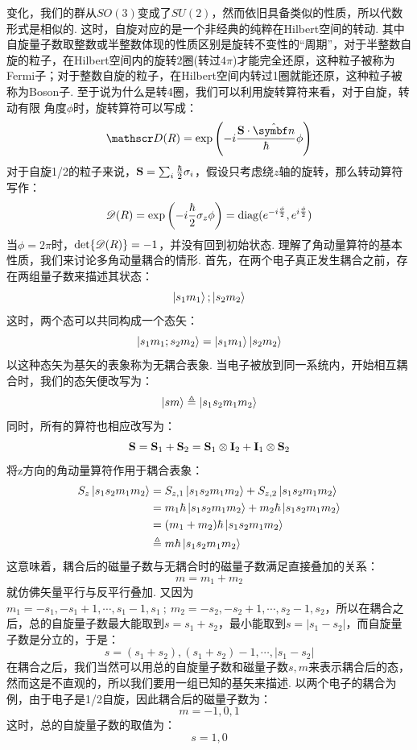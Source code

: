 变化，我们的群从\(SO(3)\)变成了\(SU(2)\)，然而依旧具备类似的性质，所以代数形式是相似的. 这时，自旋对应的是一个非经典的纯粹在Hilbert空间的转动. 其中
自旋量子数取整数或半整数体现的性质区别是旋转不变性的“周期”，对于半整数自旋的粒子，在Hilbert空间内的旋转2圈(转过\(4\pi\))才能完全还原，这种粒子被称为
Fermi子；对于整数自旋的粒子，在Hilbert空间内转过1圈就能还原，这种粒子被称为Boson子. 至于说为什么是转4圈，我们可以利用旋转算符来看，对于自旋，转动有限
角度\(\phi\)时，旋转算符可以写成：
\[
\rotate(R) = \exp\br{-i\frac{\vS\cdot\uv{n}}{\hh}\phi}
\]
对于自旋1/2的粒子来说，\(\mathbf{S} = \sum_{i}\frac{\hbar}{2}\sigma_{i}\)，假设只考虑绕\(z\)轴的旋转，那么转动算符写作：
\[
\mathscr{D}(R) = \exp\left({-i\frac{\hbar}{2}\sigma_{z}\phi}\right) = \mathrm{diag}(e^{-i\frac{\phi}{2}},e^{i\frac{\phi}{2}})
\]
当\(\phi = 2\pi\)时，\(\det{\mathscr{D}(R)} = -1\)，并没有回到初始状态. 理解了角动量算符的基本性质，我们来讨论多角动量耦合的情形. 首先，在两个电子真正发生耦合之前，存在两组量子数来描述其状态：
\[
\ket{s_{1}m_{1}} ; \ket{s_{2}m_{2}}
\]
这时，两个态可以共同构成一个态矢：
\[
\ket{s_{1}m_{1};s_{2}m_{2}} = \ket{s_{1}m_{1}}\ket{s_{2}m_{2}}
\]
以这种态矢为基矢的表象称为无耦合表象. 当电子被放到同一系统内，开始相互耦合时，我们的态矢便改写为：
\[
\ket{sm}\triangleq\ket{s_{1}s_{2}m_{1}m_{2}}
\]
同时，所有的算符也相应改写为：
\[
\mathbf{S} = \mathbf{S}_{1} + \mathbf{S}_{2} = \mathbf{S}_{1}\otimes \mathbf{I}_{2} + \mathbf{I}_{1}\otimes\mathbf{S}_{2}
\]
将z方向的角动量算符作用于耦合表象：
\begin{align*}
{S}_{z}\ket{s_{1}s_{2}m_{1}m_{2}} 
& = {S}_{z,1}\ket{s_{1}s_{2}m_{1}m_{2}} + {S}_{z,2}\ket{s_{1}s_{2}m_{1}m_{2}} \\
& = m_{1}\hbar\ket{s_{1}s_{2}m_{1}m_{2}} + m_{2}\hbar\ket{s_{1}s_{2}m_{1}m_{2}} \\
& = (m_{1} + m_{2})\hbar\ket{s_{1}s_{2}m_{1}m_{2}}  \\
&\triangleq m\hbar\ket{s_{1}s_{2}m_{1}m_{2}} 
\end{align*}
这意味着，耦合后的磁量子数与无耦合时的磁量子数满足直接叠加的关系：
\[
m = m_{1} + m_{2}
\]
就仿佛矢量平行与反平行叠加. 又因为\(m_{1}=-s_{1},-s_{1}+1,\cdots,s_{1}-1,s_{1}\ ;\ m_{2} = -s_{2},-s_{2}+1,\cdots,s_{2}-1,s_{2}\)，所以在耦合之后，总的自旋量子数最大能取到\(s=s_{1}+s_{2}\)，最小能取到\(s=|s_{1} - s_{2}|\)，而自旋量子数是分立的，于是：
\[
s = (s_{1}+s_{2}), (s_{1}+s_{2})-1, \cdots, |s_{1} - s_{2}|
\]
在耦合之后，我们当然可以用总的自旋量子数和磁量子数\(s,m\)来表示耦合后的态，然而这是不直观的，所以我们要用一组已知的基矢来描述. 以两个电子的耦合为例，由于电子是1/2自旋，因此耦合后的磁量子数为：
\[
m = -1,0, 1
\]
这时，总的自旋量子数的取值为：
\[
s = 1,0
\]
